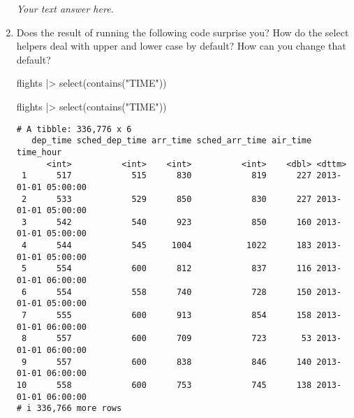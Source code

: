 \documentclass[
  letterpaper,
  DIV=11,
  numbers=noendperiod]{scrreprt}
\newenvironment{Shaded}{\begin{snugshade}}{\end{snugshade}}
\newcommand{\FunctionTok}[1]{\textcolor[rgb]{0.28,0.35,0.67}{#1}}
\newcommand{\NormalTok}[1]{\textcolor[rgb]{0.00,0.23,0.31}{#1}}
\newcommand{\SpecialCharTok}[1]{\textcolor[rgb]{0.37,0.37,0.37}{#1}}
\newcommand{\StringTok}[1]{\textcolor[rgb]{0.13,0.47,0.30}{#1}}
\begin{document}
\begin{enumerate}
  \begin{tcolorbox}[enhanced jigsaw, breakable, bottomtitle=1mm, left=2mm, colback=white, toprule=.15mm, leftrule=.75mm, colframe=quarto-callout-note-color-frame, colbacktitle=quarto-callout-note-color!10!white, title={Answer}, coltitle=black, toptitle=1mm, bottomrule=.15mm, opacitybacktitle=0.6, arc=.35mm, rightrule=.15mm, titlerule=0mm, opacityback=0]

  \emph{Your text answer here.}

  \end{tcolorbox}
\item
  Does the result of running the following code surprise you? How do the
  select helpers deal with upper and lower case by default? How can you
  change that default?

\begin{Shaded}
\begin{Highlighting}[]
\NormalTok{flights }\SpecialCharTok{|\textgreater{}} 
  \FunctionTok{select}\NormalTok{(}\FunctionTok{contains}\NormalTok{(}\StringTok{"TIME"}\NormalTok{))}
\end{Highlighting}
\end{Shaded}

  \begin{tcolorbox}[enhanced jigsaw, breakable, bottomtitle=1mm, left=2mm, colback=white, toprule=.15mm, leftrule=.75mm, colframe=quarto-callout-note-color-frame, colbacktitle=quarto-callout-note-color!10!white, title={Answer}, coltitle=black, toptitle=1mm, bottomrule=.15mm, opacitybacktitle=0.6, arc=.35mm, rightrule=.15mm, titlerule=0mm, opacityback=0]

\begin{Shaded}
\begin{Highlighting}[]
\NormalTok{flights }\SpecialCharTok{|\textgreater{}} 
  \FunctionTok{select}\NormalTok{(}\FunctionTok{contains}\NormalTok{(}\StringTok{"TIME"}\NormalTok{))}
\end{Highlighting}
\end{Shaded}

\begin{verbatim}
# A tibble: 336,776 x 6
   dep_time sched_dep_time arr_time sched_arr_time air_time time_hour          
      <int>          <int>    <int>          <int>    <dbl> <dttm>             
 1      517            515      830            819      227 2013-01-01 05:00:00
 2      533            529      850            830      227 2013-01-01 05:00:00
 3      542            540      923            850      160 2013-01-01 05:00:00
 4      544            545     1004           1022      183 2013-01-01 05:00:00
 5      554            600      812            837      116 2013-01-01 06:00:00
 6      554            558      740            728      150 2013-01-01 05:00:00
 7      555            600      913            854      158 2013-01-01 06:00:00
 8      557            600      709            723       53 2013-01-01 06:00:00
 9      557            600      838            846      140 2013-01-01 06:00:00
10      558            600      753            745      138 2013-01-01 06:00:00
# i 336,766 more rows
\end{verbatim}


\end{tcolorbox}
\end{enumerate}
\end{document}
